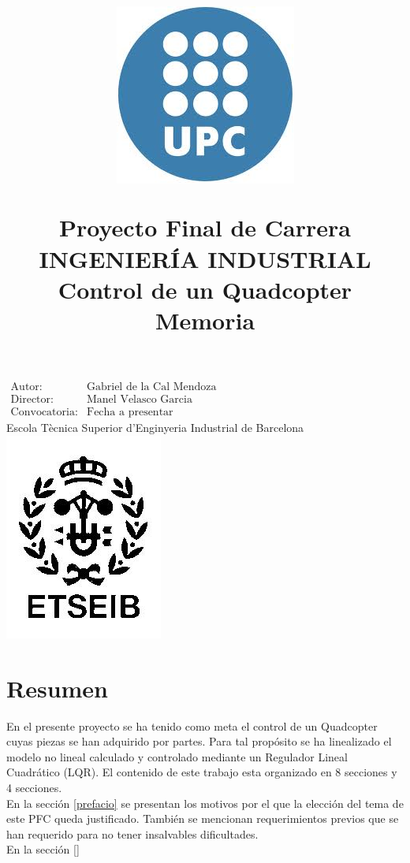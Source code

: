 \documentclass[twoside]{article}
\title{\begin{center} 
\includegraphics[scale=0.3]{images/upc.jpg} 
\end{center} 
\vspace{1cm} 
Proyecto Final de Carrera\\
INGENIERÍA INDUSTRIAL \\
\vspace{1.5cm} 
\Huge{Control de un Quadcopter} 
\vspace{2cm} \\ 
Memoria}
\date{}
\begin{document}
\maketitle
\begin{center}
\large{
$\begin{array}{ll}
\mbox{Autor:} & \mbox{Gabriel de la Cal Mendoza} \\
\mbox{Director:} & \mbox{Manel Velasco Garcia} \\
\mbox{Convocatoria:} & \mbox{Fecha a presentar}
\end{array}$}
\\ \vspace{2cm} \Large{Escola Tècnica Superior d'Enginyeria Industrial de Barcelona}\\ \vspace{1cm}
\includegraphics[scale=0.4]{images/etseib.jpg}
\end{center}

\thispagestyle{empty}
\newpage
\begin{center}

\end{center}
\thispagestyle{empty}
\newpage
\setcounter{page}{1}

\section*{Resumen}

En el presente proyecto se ha tenido como meta el control de un Quadcopter cuyas piezas se han adquirido por partes. Para tal propósito se ha linealizado  el modelo no lineal calculado y controlado mediante un Regulador Lineal Cuadrático (LQR). El contenido de este trabajo esta organizado en 8 secciones y 4 secciones.\\

En la sección \ref{prefacio} se presentan los motivos por el que la elección del tema de este PFC queda justificado. También se mencionan requerimientos previos que se han requerido para no tener insalvables dificultades. \\
En la sección \ref{}
\end{document}
